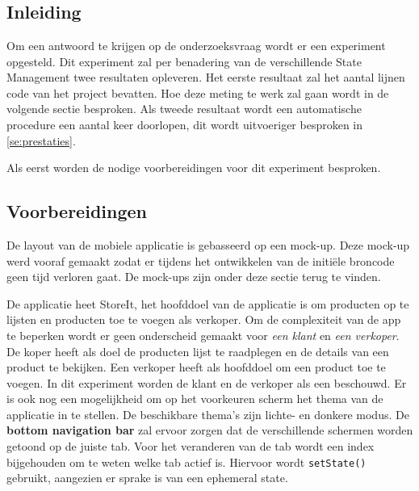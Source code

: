 
\chapter{}
\label{ch:methodologie}

\section{Inleiding}
Om een antwoord te krijgen op de onderzoeksvraag wordt er een experiment opgesteld. Dit experiment zal per benadering van de verschillende State Management twee resultaten opleveren. Het eerste resultaat zal het aantal lijnen code van het project bevatten. Hoe deze meting te werk zal gaan wordt in de volgende sectie besproken. Als tweede resultaat wordt een automatische procedure een aantal keer doorlopen, dit wordt uitvoeriger besproken in \ref{se:prestaties}.

Als eerst worden de nodige voorbereidingen voor dit experiment besproken.

\section{Voorbereidingen}
De layout van de mobiele applicatie is gebasseerd op een mock-up. Deze mock-up werd vooraf gemaakt zodat er tijdens het ontwikkelen van de initiële broncode geen tijd verloren gaat. De mock-ups zijn onder deze sectie terug te vinden.

De applicatie heet StoreIt, het hoofddoel van de applicatie is om producten op te lijsten en producten toe te voegen als verkoper. Om de complexiteit van de app te beperken wordt er geen onderscheid gemaakt voor \textit{een klant} en \textit{een verkoper}. De koper heeft als doel de producten lijst te raadplegen en de details van een product te bekijken. Een verkoper heeft als hoofddoel om een product toe te voegen. In dit experiment worden de klant en de verkoper als een beschouwd. Er is ook nog een mogelijkheid om op het voorkeuren scherm het thema van de applicatie in te stellen. De beschikbare thema's zijn lichte- en donkere modus.
De \textbf{bottom navigation bar} zal ervoor zorgen dat de verschillende schermen worden getoond op de juiste tab. Voor het veranderen van de tab wordt een index bijgehouden om te weten welke tab actief is. Hiervoor wordt \verb|setState()| gebruikt, aangezien er sprake is van een ephemeral state.


